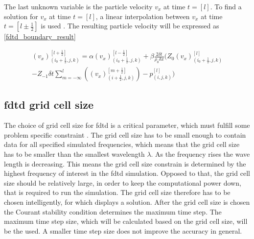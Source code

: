 The last unknown variable is the particle velocity $v_x$ at time $t=[l]$. To find a solution for $v_x$ at time $t=[l]$, a linear interpolation between $v_x$ at time $t=[l \pm \frac{1}{2}]$ is used \citep{finiteproblems}. The resulting particle velocity will be expressed as \autoref{fdtd_boundary_result}

\begin{multline}\label{fdtd_boundary_result}
(v_x)_{(i_0+\frac{1}{2},j,k)}^{[l+\frac{1}{2}]}= \alpha (v_x)_{(i_0+\frac{1}{2},j,k)}^{[l-\frac{1}{2}]} + \beta \frac{2 \delta t}{\rho_0 \delta x} \Biggl( 
 Z_0(v_x)_{(i_0+\frac{1}{2},j,k)}^{[l]} \\
-Z_{-1} \delta t \sum_{m=-\infty}^{l} \left( (v_x)_{(i+\frac{1}{2},j,k)}^{[m+\frac{1}{2}]} \right) -p_{(i,j,k)}^{[l]}
\Biggr)
\end{multline}


         \startexplain
    \stopexplain



\subsection{\gls{fdtd} grid cell size}

The choice of grid cell size for \gls{fdtd} is a critical parameter, which must fulfill some problem specific constraint \citep{Kunz1993}. The grid cell size has to be small enough to contain data for all specified simulated frequencies, which means that the grid cell size has to be smaller than the smallest wavelength $\lambda$. As the frequency rises the wave length is decreasing. This means the grid cell size constrain is determined by the highest frequency of interest in the \gls{fdtd} simulation. Opposed to that, the grid cell size should be relatively large, in order to keep the computational power down, that is required to run the simulation. The grid cell size therefore has to be chosen intelligently, for which \citep{Kunz1993} displays a solution. After the grid cell size is chosen the Courant stability condition determines the maximum time step. The maximum time step size, which will be calculated based on the grid cell size, will be the used. A smaller time step size does not improve the accuracy in general. \\


